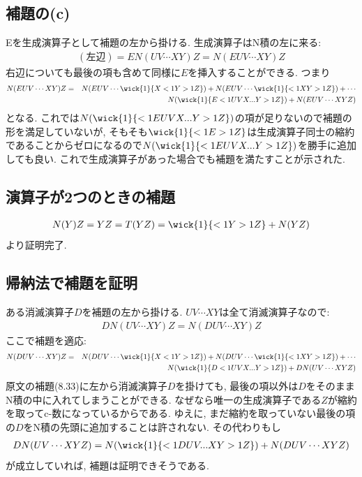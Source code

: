 \documentclass[10.5pt,a4paper]{jreport}
\begin{document}
\subsection{補題の(c)}
Eを生成演算子として補題の左から掛ける. 生成演算子はN積の左に来る:
\begin{eqnarray}
  (左辺) = EN(UV\cdots XY)Z = N(EUV\cdots XY)Z
\end{eqnarray}
右辺についても最後の項も含めて同様に$E$を挿入することができる. つまり
\begin{eqnarray}
\nonumber  N(EUV\cdots XY)Z &=& N(EUV\cdots \wick{1}{X <1Y >1Z}) + N(EUV\cdots \wick{1}{<1X Y >1Z}) + \cdots \\
  && N(\wick{1}{E<1UVX... Y >1Z}) + N(EUV\cdots XYZ)
\end{eqnarray}
となる. これでは$N(\wick{1}{<1EUVX... Y >1Z})$の項が足りないので補題の形を満足していないが, そもそも$\wick{1}{<1E>1Z}$は生成演算子同士の縮約であることからゼロになるので$N(\wick{1}{<1EUVX... Y >1Z})$を勝手に追加しても良い. これで生成演算子があった場合でも補題を満たすことが示された. 
\subsection{演算子が2つのときの補題}
\begin{eqnarray}
  N(Y)Z = YZ = T(YZ) = \wick{1}{<1Y >1Z} + N(YZ)
\end{eqnarray}
より証明完了.

\subsection{帰納法で補題を証明}
ある消滅演算子$D$を補題の左から掛ける. $UV\cdots XY$は全て消滅演算子なので:
\begin{eqnarray}
  DN(UV\cdots XY)Z = N(DUV\cdots XY)Z
\end{eqnarray}
ここで補題を適応:
\begin{eqnarray}
\nonumber  N(DUV\cdots XY)Z &=& N(DUV\cdots \wick{1}{X <1Y >1Z}) + N(DUV\cdots \wick{1}{<1X Y >1Z}) + \cdots \\
  && N(\wick{1}{D<1UVX... Y >1Z}) + DN(UV\cdots XYZ)
\end{eqnarray}
原文の補題(8.33)に左から消滅演算子$D$を掛けても, 最後の項以外は$D$をそのままN積の中に入れてしまうことができる. なぜなら唯一の生成演算子である$Z$が縮約を取ってc-数になっているからである. ゆえに, まだ縮約を取っていない最後の項の$D$をN積の先頭に追加することは許されない. その代わりもし
\begin{eqnarray}
  DN(UV\cdots XYZ) = N(\wick{1}{<1DUV... XY>1Z}) + N(DUV\cdots XYZ)\label{wick5}
\end{eqnarray}
が成立していれば, 補題は証明できそうである. 
\end{document}
